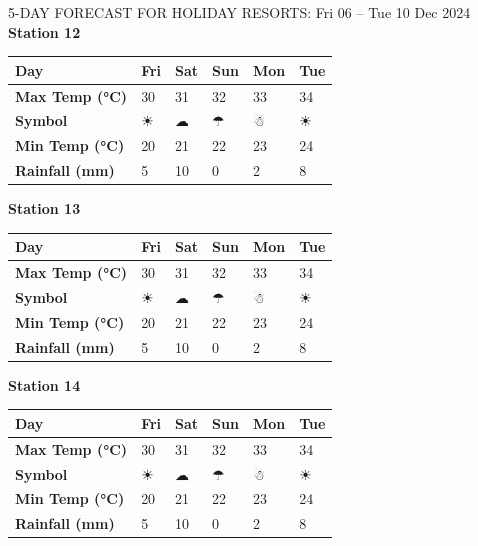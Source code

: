 \begin{frame}{5-DAY FORECAST FOR HOLIDAY RESORTS: Fri 06 – Tue 10 Dec 2024}
        \textbf{Station 12} \\
        \renewcommand{\arraystretch}{1.2} %
        \begin{tabular}{|p{2cm}|p{1.8cm}|p{1.8cm}|p{1.8cm}|p{1.8cm}|p{1.8cm}|}
        \hline
        \textbf{Day} & Fri & Sat & Sun & Mon & Tue \\ \hline
\textbf{Max Temp (°C)} & 30 & 31 & 32 & 33 & 34 \\ \hline
\textbf{Symbol} & ☀ & ☁ & ☂ & ☃ & ☀ \\ \hline
\textbf{Min Temp (°C)} & 20 & 21 & 22 & 23 & 24 \\ \hline
\textbf{Rainfall (mm)} & 5 & 10 & 0 & 2 & 8 \\ \hline
        \end{tabular}
        \vspace{0.5cm} %
        
        \textbf{Station 13} \\
        \renewcommand{\arraystretch}{1.2} %
        \begin{tabular}{|p{2cm}|p{1.8cm}|p{1.8cm}|p{1.8cm}|p{1.8cm}|p{1.8cm}|}
        \hline
        \textbf{Day} & Fri & Sat & Sun & Mon & Tue \\ \hline
\textbf{Max Temp (°C)} & 30 & 31 & 32 & 33 & 34 \\ \hline
\textbf{Symbol} & ☀ & ☁ & ☂ & ☃ & ☀ \\ \hline
\textbf{Min Temp (°C)} & 20 & 21 & 22 & 23 & 24 \\ \hline
\textbf{Rainfall (mm)} & 5 & 10 & 0 & 2 & 8 \\ \hline
        \end{tabular}
        \vspace{0.5cm} %
        
        \textbf{Station 14} \\
        \renewcommand{\arraystretch}{1.2} %
        \begin{tabular}{|p{2cm}|p{1.8cm}|p{1.8cm}|p{1.8cm}|p{1.8cm}|p{1.8cm}|}
        \hline
        \textbf{Day} & Fri & Sat & Sun & Mon & Tue \\ \hline
\textbf{Max Temp (°C)} & 30 & 31 & 32 & 33 & 34 \\ \hline
\textbf{Symbol} & ☀ & ☁ & ☂ & ☃ & ☀ \\ \hline
\textbf{Min Temp (°C)} & 20 & 21 & 22 & 23 & 24 \\ \hline
\textbf{Rainfall (mm)} & 5 & 10 & 0 & 2 & 8 \\ \hline
        \end{tabular}
        \vspace{0.5cm} %
        

\end{frame}
